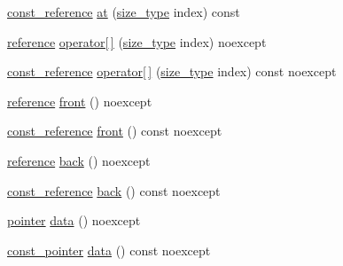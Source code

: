 \begin{DoxyCompactItemize}
\item 
\mbox{\hyperlink{classmage_1_1_component_manager_ae1b1c864f0dc2cd35c63e1084971b89c}{const\+\_\+reference}} \mbox{\hyperlink{classmage_1_1_component_manager_adfce9c52a4a63f792d18fda2b101b5a5}{at}} (\mbox{\hyperlink{classmage_1_1_component_manager_a6bd219525db9ec9f3adb9259e52674da}{size\+\_\+type}} index) const
\item 
\mbox{\hyperlink{classmage_1_1_component_manager_a4daeb292f527534c155e359faf7eaf80}{reference}} \mbox{\hyperlink{classmage_1_1_component_manager_a6216d62333ef2eafa8b64a6e8d67aa4e}{operator\mbox{[}$\,$\mbox{]}}} (\mbox{\hyperlink{classmage_1_1_component_manager_a6bd219525db9ec9f3adb9259e52674da}{size\+\_\+type}} index) noexcept
\item 
\mbox{\hyperlink{classmage_1_1_component_manager_ae1b1c864f0dc2cd35c63e1084971b89c}{const\+\_\+reference}} \mbox{\hyperlink{classmage_1_1_component_manager_accbb5b12be0fcc026e44de16dd1fe1c0}{operator\mbox{[}$\,$\mbox{]}}} (\mbox{\hyperlink{classmage_1_1_component_manager_a6bd219525db9ec9f3adb9259e52674da}{size\+\_\+type}} index) const noexcept
\item 
\mbox{\hyperlink{classmage_1_1_component_manager_a4daeb292f527534c155e359faf7eaf80}{reference}} \mbox{\hyperlink{classmage_1_1_component_manager_a151bff7fcddb05f821fb7577c052e452}{front}} () noexcept
\item 
\mbox{\hyperlink{classmage_1_1_component_manager_ae1b1c864f0dc2cd35c63e1084971b89c}{const\+\_\+reference}} \mbox{\hyperlink{classmage_1_1_component_manager_a0c72473eb010a2bcd121e27f626f83c5}{front}} () const noexcept
\item 
\mbox{\hyperlink{classmage_1_1_component_manager_a4daeb292f527534c155e359faf7eaf80}{reference}} \mbox{\hyperlink{classmage_1_1_component_manager_a17bdea8d1d738f8f5da239592bef69e6}{back}} () noexcept
\item 
\mbox{\hyperlink{classmage_1_1_component_manager_ae1b1c864f0dc2cd35c63e1084971b89c}{const\+\_\+reference}} \mbox{\hyperlink{classmage_1_1_component_manager_a807f7e0c4c72e44e8e1474d543010a7f}{back}} () const noexcept
\item 
\mbox{\hyperlink{classmage_1_1_component_manager_a8a96debf4c395e068990c85e8b66d564}{pointer}} \mbox{\hyperlink{classmage_1_1_component_manager_ac9c6e209d82b09cf1d6c3893ed66efa3}{data}} () noexcept
\item 
\mbox{\hyperlink{classmage_1_1_component_manager_aca0462fe048337b5453e72cb7facaf31}{const\+\_\+pointer}} \mbox{\hyperlink{classmage_1_1_component_manager_a77452ebe6099db2d2ced2788a06c2c74}{data}} () const noexcept

\end{DoxyCompactItemize}
